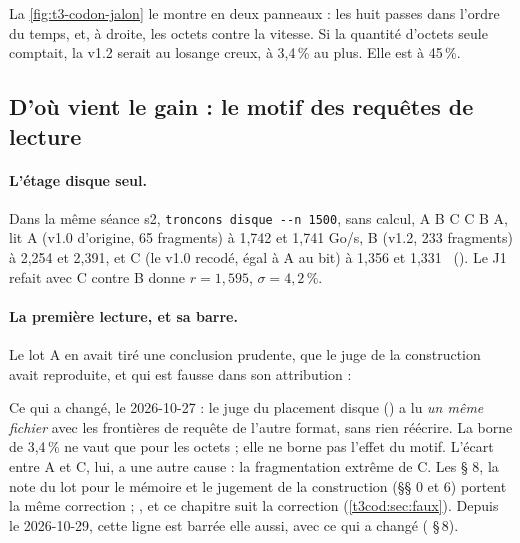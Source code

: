 La \cref{fig:t3-codon-jalon} le montre en deux panneaux : les huit passes dans l'ordre du temps, et, à droite, les octets contre la vitesse. Si la quantité d'octets seule comptait, la v1.2 serait au losange creux, à 3,4\,\% au plus. Elle est à 45\,\%.

\subsection{D'où vient le gain : le motif des requêtes de lecture}\label{t3cod:sec:motif}

\paragraph{L'étage disque seul.} Dans la même séance s2, \texttt{troncons disque -{}-n 1500}, sans calcul, A B C C B A, lit A (v1.0 d'origine, 65 fragments) à 1,742 et 1,741 Go/s, B (v1.2, 233 fragments) à 2,254 et 2,391, et C (le v1.0 recodé, égal à A au bit) à 1,356 et 1,331 \mes~(). Le J1 refait avec C contre B donne $r = 1{,}595$, $\sigma = 4{,}2\,\%$.

\paragraph{La première lecture, et sa barre.} Le lot A en avait tiré une conclusion prudente, que le juge de la construction avait reproduite, et qui est fausse dans son attribution :
\begin{quote}
\end{quote}
Ce qui a changé, le 2026-10-27 : le juge du placement disque () a lu \emph{un même fichier} avec les frontières de requête de l'autre format, sans rien réécrire. La borne de 3,4\,\% ne vaut que pour les octets ; elle ne borne pas l'effet du motif. L'écart entre A et C, lui, a une autre cause : la fragmentation extrême de C. Les  § 8, la note du lot pour le mémoire et le jugement de la construction (§§ 0 et 6) portent la même correction ; , et ce chapitre suit la correction (\cref{t3cod:sec:faux}). Depuis le 2026-10-29, cette ligne est barrée elle aussi, avec ce qui a changé ( §\,8).

